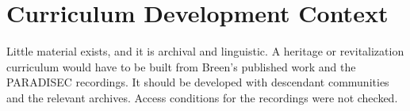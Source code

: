 \documentclass[12pt]{article}
\begin{document}
\section{Curriculum Development Context}
Little material exists, and it is archival and linguistic. A heritage or revitalization curriculum would have to be built from Breen's published work and the PARADISEC recordings. It should be developed with descendant communities and the relevant archives. Access conditions for the recordings were not checked.
\end{document}
